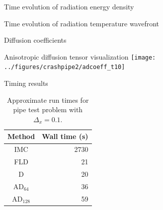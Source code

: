 \documentclass{beamer}
\begin{document}
\begin{frame}{Time evolution of radiation energy density}

\centering
\hspace{-1in}%
%
\only<2>{}%
\only<3>{}%
\only<4>{}%
%
\hspace{-.35in}
%
%
%
%
%
\hspace{-1in}
\par
  
\vspace{-\baselineskip}\small
{}%
%
%
%
%
\end{frame}

\begin{frame}{Time evolution of radiation temperature wavefront}
  \centering%
  \par
\end{frame}
\begin{frame}{Diffusion coefficients}
  \centering%
  \par
\end{frame}
\begin{frame}{Anisotropic diffusion tensor visualization}
  \centering%
  \texttt{[image: ../figures/crashpipe2/adcoeff\_t10]}%
  \par
\end{frame}
\begin{frame}{Timing results}
  \begin{table}[htb]
    \centering
    \begin{tabular}{cr}
      Method & Wall time (s) \\ \hline
      IMC & 2730 \\
      FLD & 21 \\
      D   & 20 \\
      AD$_{64}$ & 36 \\
      AD$_{128}$ & 59
    \end{tabular}
    \caption{Approximate run times for pipe test problem with $\Delta_x=0.1$.}
    \label{tab:pipeTiming}
  \end{table}
\end{frame}
\end{document}
